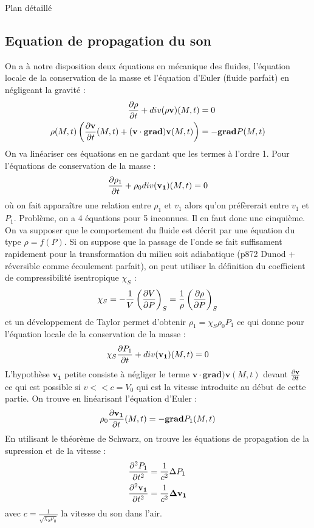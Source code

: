 \begin{reportBlock}{Plan détaillé}
  \subsection{Equation de propagation du son}
  On a à notre disposition deux équations en mécanique des fluides, l'équation locale de la conservation de la masse et l'équation d'Euler (fluide parfait) en négligeant la gravité :
  \begin{align}
      \frac{\partial \rho}{\partial t} + div(\rho\mathbf{v})(M,t) &= 0 \\
      \rho(M,t)\left(\frac{\partial \mathbf{v}}{\partial t}(M,t) + (\mathbf{v}\cdot\mathbf{grad})\mathbf{v}(M,t) \right) &= -\mathbf{grad}P(M,t)
  \end{align}
  On va linéariser ces équations en ne gardant que les termes à l'ordre 1. Pour l'équations de conservation de la masse :
  \begin{equation}
      \frac{\partial \rho_1}{\partial t} + \rho_0div(\mathbf{v_1})(M,t) = 0
  \end{equation}
  où on fait apparaître une relation entre $\rho_1$ et $v_1$ alors qu'on préfèrerait entre $v_1$ et $P_1$. Problème, on a 4 équations pour 5 inconnues. Il en faut donc une cinquième. On va supposer que le comportement du fluide est décrit par une équation du type $\rho =f(P)$. Si on suppose que la passage de l'onde se fait suffisament rapidement pour la transformation du milieu soit adiabatique (p872 Dunod + réversible comme écoulement parfait), on peut utiliser la définition du coefficient de compressibilité isentropique $\chi_S$ :
  \begin{equation}
      \chi_S = -\frac{1}{V}\left(\frac{\partial V}{\partial P}\right)_S = \frac{1}{\rho}\left(\frac{\partial \rho}{\partial P}\right)_S
  \end{equation}
  et un développement de Taylor permet d'obtenir $\rho_1 = \chi_S\rho_0P_1$ ce qui donne pour l'équation locale de la conservation de la masse :
  \begin{equation}
      \chi_S\frac{\partial P_1}{\partial t} + div(\mathbf{v_1})(M,t) = 0
  \end{equation}
  L'hypothèse $\mathbf{v_1}$ petite consiste à négliger le terme $\mathbf{v}\cdot\mathbf{grad})\mathbf{v}(M,t)$ devant $\frac{\partial \mathbf{v}}{\partial t}$ ce qui est possible si $v<<c=V_0$ qui est la vitesse introduite au début de cette partie. On trouve en linéarisant l'équation d'Euler :
  \begin{equation}
      \rho_0\frac{\partial \mathbf{v_1}}{\partial t}(M,t) = -\mathbf{grad}P_1(M,t)
  \end{equation}
  En utilisant le théorème de Schwarz, on trouve les équations de propagation de la supression et de la vitesse :
  \begin{align}
    \frac{\partial ^2P_1}{\partial t^2} &= \frac{1}{c^2}\Delta P_1 \\
    \frac{\partial ^2\mathbf{v_1}}{\partial t^2} &= \frac{1}{c^2}\mathbf{\Delta v_1}     
  \end{align}
  avec $c = \frac{1}{\sqrt{\chi_S\rho_0}}$ la vitesse du son dans l'air.
  

\end{reportBlock}
